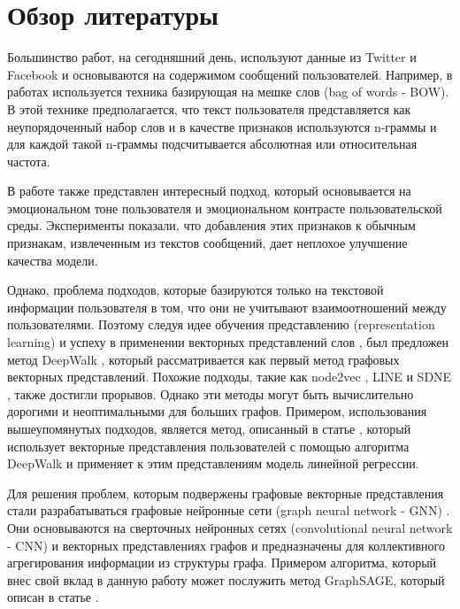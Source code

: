 \section{Обзор литературы}

Большинство работ, на сегодняшний день, используют данные из Twitter и Facebook и основываются на содержимом сообщений пользователей. Например, в работах \cite{Learning multiview embeddings of twitter users, Developing age and gender predictive lexica over social media, Cross-platform differences in self-disclosure and trait prediction} используется техника базирующая на мешке слов (bag of words - BOW). В этой технике предполагается, что текст пользователя представляется как неупорядоченный набор слов и в качестве признаков используются n-граммы и для каждой такой n-граммы подсчитывается абсолютная или относительная частота. 

В работе \cite{Inferring perceived demographics from user emotional tone and user-environment emotional contrast} также представлен интересный подход, который основывается на эмоциональном тоне пользователя и эмоциональном контрасте пользовательской среды. Эксперименты показали, что добавления этих признаков к обычным признакам, извлеченным из текстов сообщений, дает неплохое улучшение качества модели.

Однако, проблема подходов, которые базируются только на текстовой информации пользователя в том, что они не учитывают взаимоотношений между пользователями. Поэтому следуя идее обучения представлению (representation learning) и успеху  в применении векторных представлений слов \cite{Efficient estimation of word representations in vector space}, был предложен метод DeepWalk \cite{DeepWalk}, который рассматривается как первый метод графовых векторных представлений. Похожие подходы, такие как node2vec \cite{Node2Vec}, LINE  \cite{LINE} и SDNE \cite{SDNE}, также достигли прорывов. Однако эти методы могут быть вычислительно дорогими и неоптимальными для больших графов. Примером, использования вышеупомянутых подходов, является метод, описанный в статье \cite{Exact age prediction in social networks}, который использует векторные представления пользователей с помощью алгоритма DeepWalk  и применяет к этим представлениям модель линейной регрессии. 

Для решения проблем, которым подвержены графовые векторные представления стали разрабатываться графовые нейронные сети (graph neural network - GNN) \cite{Graph neural networks: A review of methods and applications}. Они основываются на сверточных нейронных сетях (convolutional neural network - CNN) и векторных представлениях графов и предназначены для коллективного агрегирования информации из структуры графа. Примером алгоритма, который внес свой вклад в данную работу может послужить метод GraphSAGE, который описан в статье \cite{GraphSAGE}.






\clearpage